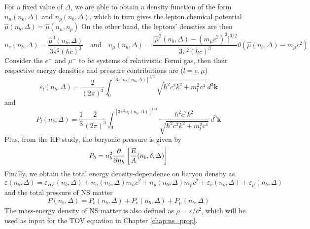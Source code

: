 For a fixed value of $\Delta$, we are able to obtain a density function of the form $n_n (n_b, \Delta)$ and $n_p (n_b, \Delta)$, which in turn gives the lepton chemical potential $\hat{\mu}(n_b,\Delta) = \hat{\mu}(n_n,n_p)$ On the other hand, the leptons' densities are then
\begin{equation}
        n_e(n_b,\Delta) = \frac{ \hat{\mu}^3(n_b,\Delta)}{ 3\pi^2 (\hbar c)^3} \quad\text{and}\quad n_\mu(n_b,\Delta) = \frac{ \Big[\hat{\mu}^2(n_b,\Delta) - (m_\mu c^2)^2\Big]^{3/2}}{ 3\pi^2 (\hbar c)^3} \theta(\hat{\mu}(n_b,\Delta)-m_\mu c^2)
\end{equation} 
Consider the $e^-$ and $\mu^-$ to be systems of relativistic Fermi gas, then their respective energy densities and pressure contributions are ($l=e,\mu$) \citep{moustakidis2009equation}
\begin{equation}
        \varepsilon_l(n_b,\Delta) = \frac{ 2}{ (2\pi)^3} \int_{{0}}^{{[3\pi^2n_l(n_b,\Delta)]^{1/3}}} {\sqrt{\hbar^2 c^2 k^2 + m_l^2 c^4}} \: d^3{\mathbf{k}}
\end{equation} 
and
\begin{equation}
        P_l(n_b,\Delta) = \frac{ 1}{ 3} \frac{ 2}{ (2\pi)^3} \int_{{0}}^{{[3\pi^2 n_l(n_b,\Delta)]^{1/3}}} { \frac{ \hbar^2 c^2 k^2}{ \sqrt{\hbar^2 c^2 k^2 + m_l^2 c^4}} } \: d^3{\mathbf{k}}
\end{equation} 
Plus, from the \gls{HF} study, the baryonic pressure is given by
\begin{equation}
    P_b = n_b^2 \pdv{}{n_b} \left[ \frac{E}{A}(n_b,\delta,\Delta) \right]
\end{equation}
Finally, we obtain the total energy density-dependence on baryon density as 
\begin{equation}
        \varepsilon(n_b,\Delta) = \varepsilon_{HF}(n_b,\Delta) + n_n(n_b,\Delta)m_n c^2 + n_p(n_b,\Delta)m_p c^2 + \varepsilon_e(n_b,\Delta) + \varepsilon_\mu(n_b,\Delta)
\end{equation}
and the total pressure of \gls{NS} matter
\begin{equation}
        P(n_b,\Delta) = P_b(n_b,\Delta) + P_e(n_b,\Delta) + P_\mu(n_b,\Delta)
\end{equation}
The mass-energy density of \gls{NS} matter is also defined as $\rho = \varepsilon/c^2$, which will be used as input for the \gls{TOV} equation in Chapter \ref{chap:ns_prop}.

